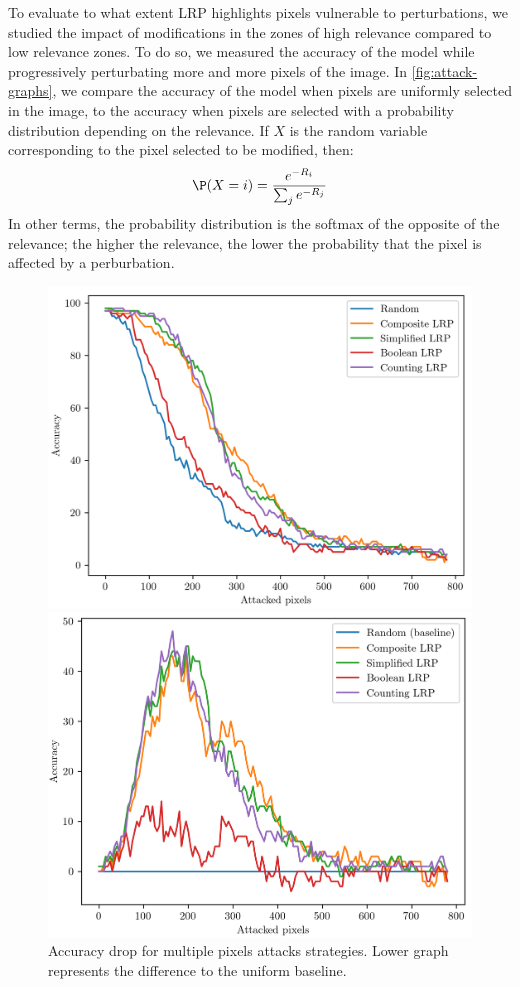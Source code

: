 \documentclass[twocolumn]{../cs-classes/cs-classes}
\newcommand*{\1}{\digitsbb{1}}
\newcommand*{\0}{\digitsbb{0}}
\begin{document}
To evaluate to what extent LRP highlights pixels vulnerable to perturbations, we studied the impact of modifications in the zones of high relevance compared to low relevance zones. To do so, we measured the accuracy of the model while progressively perturbating more and more pixels of the image. In \autoref{fig:attack-graphs}, we compare the accuracy of the model when pixels are uniformly selected in the image, to the accuracy when pixels are selected with a probability distribution depending on the relevance. If $X$ is the random variable corresponding to the pixel selected to be modified, then:
\begin{equation}
    \P(X=i) = \frac{e^{-R_i}}{\sum_je^{-R_j}}
\end{equation}
In other terms, the probability distribution is the softmax of the opposite of the relevance; the higher the relevance, the lower the probability that the pixel is affected by a perburbation.
\begin{figure}[H]
    \includegraphics[width=.95\linewidth]{attack-graph-1.png}
    
    \includegraphics[width=.95\linewidth]{attack-graph-2.png}
    \caption{Accuracy drop for multiple pixels attacks strategies. Lower graph represents the difference to the uniform baseline.}
    \label{fig:attack-graphs}
\end{figure}
\end{document}
